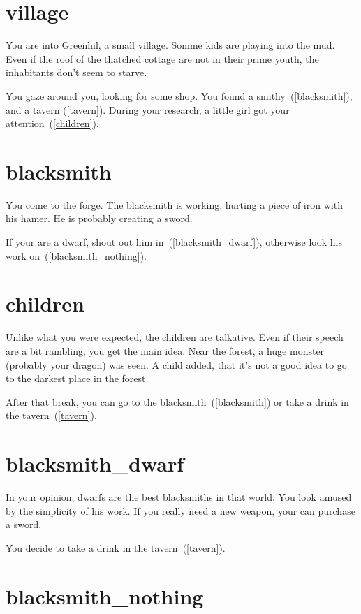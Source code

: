 
\section{village}

You are into Greenhil, a small village. Somme kids are playing into
the mud. Even if the roof of the thatched cottage are not in their prime youth,
the inhabitants don't seem to starve.

You gaze around you, looking for some shop. You found a
smithy~(\ref{blacksmith}), and a tavern (\ref{tavern}). During your research, a
little girl got your attention~(\ref{children}).

\section{blacksmith}

You come to the forge. The blacksmith is working, hurting a piece of iron with
his hamer. He is probably creating a sword.

If your are a dwarf, shout out him in~(\ref{blacksmith_dwarf}), otherwise look his
work on~(\ref{blacksmith_nothing}).

\section{children}

Unlike what you were expected, the children are talkative. Even if their speech
are a bit rambling, you get the main idea. Near the forest, a huge monster
(probably your dragon) was seen. A child added, that it's not a good idea to go
to the darkest place in the forest.

After that break, you can go to the blacksmith~(\ref{blacksmith}) or take a drink in
the tavern~(\ref{tavern}).

\section{blacksmith_dwarf}

In your opinion, dwarfs are the best blacksmiths in that world. You look amused
by the simplicity of his work. If you really need a new weapon, your can
purchase a sword.

You decide to take a drink in the tavern~(\ref{tavern}).

\section{blacksmith_nothing}

